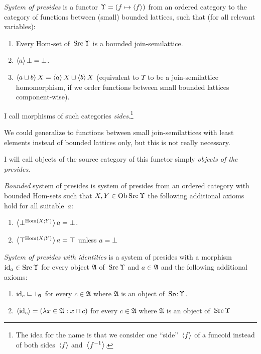 \begin{defn}
\emph{System of presides} is
a functor $\Upsilon = (f\mapsto\left\langle f\right\rangle)$ from an ordered category
to the category of functions between (small) bounded lattices,
such that (for all relevant variables):
\begin{enumerate}
  \item Every Hom-set of~$\operatorname{Src}\Upsilon$ is a bounded join-semilattice.

  \item $\left\langle a\right\rangle\bot = \bot$.

  \item $\left\langle a \sqcup b\right\rangle X = \left\langle a\right\rangle X \sqcup \left\langle b\right\rangle X$ (equivalent to $\Upsilon$ to be a join-semilattice homomorphism,
    if we order functions between small bounded lattices component-wise).
\end{enumerate}
I call morphisms of such categories \emph{sides}.\footnote{The idea for the name is that we consider one ``side''~$\left\langle f\right\rangle$ of a funcoid instead of both sides~$\left\langle f\right\rangle$ and~$\left\langle f^{-1}\right\rangle$.}
\end{defn}

\begin{rem}
We could generalize to functions between small join-semilattices with least elements instead of bounded lattices only, but this is not really necessary.
\end{rem}

\begin{defn}
I will call objects of the source category of this functor simply \emph{objects of the presides}.
\end{defn}

\begin{defn}
\emph{Bounded} system of presides is system of presides from an ordered category with bounded Hom-sets
such that $X,Y\in\operatorname{Ob}\operatorname{Src}\Upsilon$ the following additional axioms hold for all suitable~$a$:
\begin{enumerate}
  \item $\left\langle \bot^{\operatorname{Hom}(X;Y)}\right\rangle a = \bot$.

  \item $\left\langle \top^{\operatorname{Hom}(X;Y)}\right\rangle a = \top$ unless $a = \bot$
\end{enumerate}
\end{defn}

\begin{defn}
\emph{System of presides with identities} is a system of presides with
a morphism $\operatorname{id}_a\in\operatorname{Src}\Upsilon$ for every object $\mathfrak{A}$ of~$\operatorname{Src}\Upsilon$ and $a\in\mathfrak{A}$
and the following additional axioms:
\begin{enumerate}
  \item $\operatorname{id}_c \sqsubseteq 1_{\mathfrak{A}}$ for every $c \in \mathfrak{A}$
    where $\mathfrak{A}$ is an object of~$\operatorname{Src}\Upsilon$.

  \item $\left\langle \operatorname{id}_c\right\rangle = (\lambda x \in \mathfrak{A}: x \sqcap c)$ for every $c \in \mathfrak{A}$
    where $\mathfrak{A}$ is an object of~$\operatorname{Src}\Upsilon$
\end{enumerate}
\end{defn}

